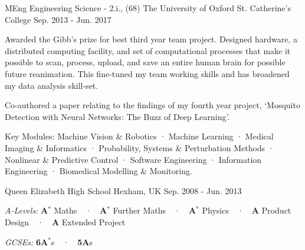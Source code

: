 \begin{cventries}
    
    \cventry
        {MEng Engineering Science - 2.i., (68)}
        {The University of Oxford}
        {St. Catherine's College}
        {Sep. 2013 - Jun. 2017}
        {
            \begin{cvitems}
                \item{Awarded the Gibb's prize for best third year team project. Designed hardware, a distributed computing facility, and set of computational processes that make it possible to scan, process, upload, and save an entire human brain for possible future reanimation. This fine-tuned my team working skills and has broadened my data analysis skill-set.}
                \item{Co-authored a paper relating to the findings of my fourth year project, `Mosquito Detection with Neural Networks: The Buzz of Deep Learning'.}
                \item{Key Modules: Machine Vision \& Robotics · Machine Learning · Medical Imaging \& Informatics · Probability, Systems \& Perturbation Methods · Nonlinear \& Predictive Control · Software Engineering · Information Engineering · Biomedical Modelling \& Monitoring.}
            \end{cvitems}
        }
        \vspace{-0.2cm}


    \cventry
        {}
        {Queen Elizabeth High School}
        {Hexham, UK}
        {Sep. 2008 - Jun. 2013}
        {\vspace{-0.5cm}
            \begin{cvitems}
                \item{\textit{A-Levels:} \textbf{A${{^*}}$} Maths~~·~~\textbf{A${{^*}}$} Further Maths~~·~~\textbf{A${{^*}}$} Physics~~·~~\textbf{A} Product Design~~·~~\textbf{A} Extended Project}
                \item{\textit{GCSEs:} \textbf{6A${{^*}}$}s~~·~~\textbf{5A}s}
            \end{cvitems}
        }
        \vspace{-0.2cm}

\end{cventries}